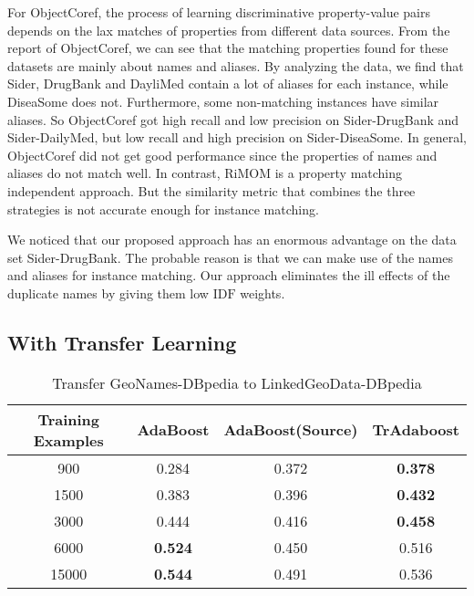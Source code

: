 For ObjectCoref, the process of learning discriminative property-value pairs depends on the lax matches of properties from different data sources. From the report of ObjectCoref\cite{hu2010objectcoref}, we can see that the matching properties found for these datasets are mainly about names and aliases. By analyzing the data, we find that Sider, DrugBank and DayliMed contain a lot of aliases for each instance, while DiseaSome does not. Furthermore, some non-matching instances have similar aliases. So ObjectCoref got high recall and low precision on Sider-DrugBank and Sider-DailyMed, but low recall and high precision on Sider-DiseaSome. In general, ObjectCoref did not get good performance since the properties of names and aliases do not match well. In contrast, RiMOM is a property matching independent approach. But the similarity metric that combines the three strategies is not accurate enough for instance matching.

We noticed that our proposed approach has an enormous advantage on the data set Sider-DrugBank. The probable reason is that we can make use of the names and aliases for instance matching. Our approach eliminates the ill effects of the duplicate names by giving them low $\mathrm{IDF}$ weights.

\subsection{With Transfer Learning}

\begin{table}[t]
\caption{Transfer GeoNames-DBpedia to LinkedGeoData-DBpedia}
\label{tab:transfer}
\centering
\begin{tabular}{c|c|c|c}
  \toprule
    Training Examples & AdaBoost & AdaBoost(Source) & TrAdaboost \\
  \midrule
    900\tnote{1} & 0.284 & 0.372 & \textbf{0.378} \\
    1500 & 0.383 & 0.396 & \textbf{0.432} \\
    3000 & 0.444 & 0.416& \textbf{0.458} \\
    6000 & \textbf{0.524} & 0.450 & 0.516 \\
    15000 & \textbf{0.544} & 0.491 & 0.536 \\
  \bottomrule
\end{tabular}
\end{table}

